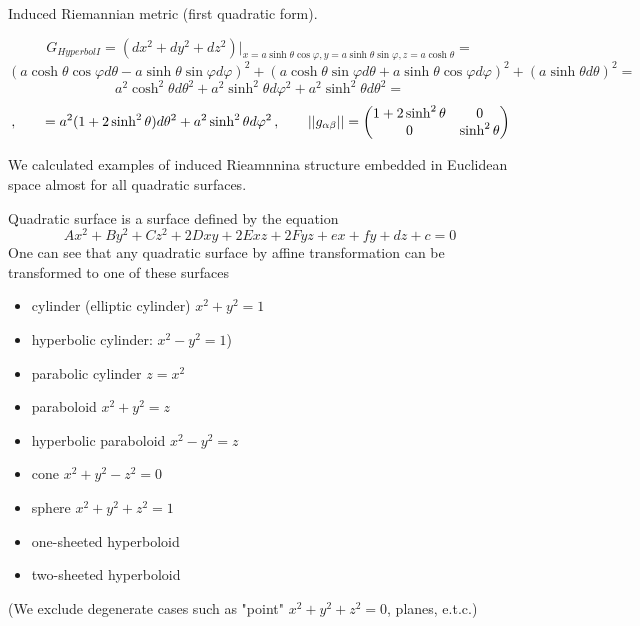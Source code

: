 \documentclass[12pt]{article}
\theoremstyle{theorem}
\numberwithin{equation}{section}
\begin{document}
Induced Riemannian metric (first quadratic form).


              $$
              G_{Hyperbol I}=\left(dx^2+dy^2+dz^2\right)\big\vert_{x=a\sinh\theta\cos\varphi,y=a\sinh\theta\sin\varphi,
              z=a\cosh\theta}=
                      $$
                      $$
                      (a\cosh\theta\cos\varphi d\theta-a\sinh\theta\sin\varphi d\varphi)^2+
                      (a\cosh\theta\sin\varphi d\theta+a\sinh\theta\cos\varphi d\varphi)^2+
                         (a\sinh\theta d\theta)^2=
                      $$
                      $$
          a^2\cosh^2\theta d\theta^2+a^2\sinh^2\theta d\varphi^2+a^2\sinh^2\theta d\theta^2=
                      $$
        \begin{equation}\label{firtsquadraticformforsphere(diff)}\,,\qquad
             =a^2(1+2\sinh^2\theta)d\theta^2+a^2\sinh^2\theta d\varphi^2\,,\qquad
                        ||g_{\alpha\beta}||=
   \begin{pmatrix}
   1+2\sinh^2\theta & 0 \\
   0&  \sinh^2\theta \\
   \end{pmatrix}
\end{equation}


\bigskip

  We calculated examples of induced Rieamnnina structure embedded in Euclidean space almost for all quadratic surfaces.

Quadratic surface is a surface defined by the equation
              $$
             Ax^2+By^2+Cz^2+2Dxy+2Exz+2Fyz+ex+fy+dz+c=0
              $$
One can see that any quadratic surface by affine transformation can be transformed to one of these surfaces

  \begin{itemize}
  \item  cylinder (elliptic cylinder) $x^2+y^2=1$

  \item  hyperbolic cylinder: $x^2-y^2=1$)

  \item  parabolic cylinder  $z=x^2$

  \item  paraboloid   $x^2+y^2=z$

  \item      hyperbolic paraboloid $x^2-y^2=z$

  \item  cone $x^2+y^2-z^2=0$

  \item  sphere $x^2+y^2+z^2=1$

  \item  one-sheeted hyperboloid

  \item   two-sheeted hyperboloid

  \end{itemize}
(We exclude degenerate cases such as "point" $x^2+y^2+z^2=0$, planes, e.t.c.)
\end{document}
